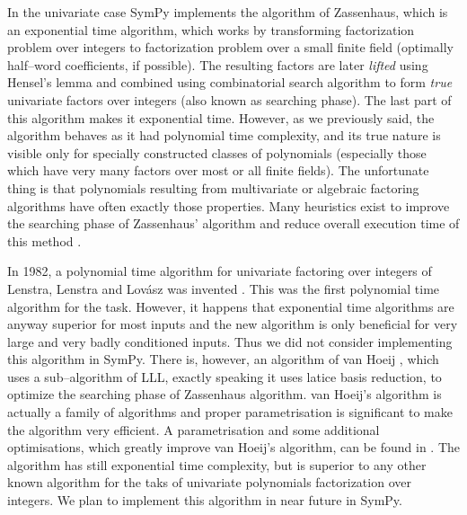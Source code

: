 In the univariate case SymPy implements the algorithm of Zassenhaus, which is an exponential time
algorithm, which works by transforming factorization problem over integers to factorization problem
over a small finite field (optimally half--word coefficients, if possible). The resulting factors
are later \emph{lifted} using Hensel's lemma and combined using combinatorial search algorithm to form
\emph{true} univariate factors over integers (also known as searching phase). The last part of this
algorithm makes it exponential time. However, as we previously said, the algorithm behaves as it
had polynomial time complexity, and its true nature is visible only for specially constructed classes
of polynomials (especially those which have very many factors over most or all finite fields). The
unfortunate thing is that polynomials resulting from multivariate or algebraic factoring algorithms
have often exactly those properties. Many heuristics exist to improve the searching phase of Zassenhaus'
algorithm and reduce overall execution time of this method \cite{Abbott2000searching}.

In 1982, a polynomial time algorithm for univariate factoring over integers of Lenstra, Lenstra and
Lovász was invented \cite{Lenstra1982factor}. This was the first polynomial time algorithm for the task.
However, it happens that exponential time algorithms are anyway superior for most inputs and the new
algorithm is only beneficial for very large and very badly conditioned inputs. Thus we did not consider
implementing this algorithm in SymPy. There is, however, an algorithm of van Hoeij \cite{vanHoeij2002knapsack},
which uses a sub--algorithm of LLL, exactly speaking it uses latice basis reduction, to optimize the
searching phase of Zassenhaus algorithm. van Hoeij's algorithm is actually a family of algorithms and
proper parametrisation is significant to make the algorithm very efficient. A parametrisation and some
additional optimisations, which greatly improve van Hoeij's algorithm, can be found in \cite{Belabas2004relative}.
The algorithm has still exponential time complexity, but is superior to any other known algorithm for the
taks of univariate polynomials factorization over integers. We plan to implement this algorithm in near
future in SymPy.

